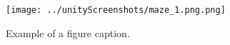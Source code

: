 \documentclass[conference]{IEEEtran}
\begin{document}
\begin{figure}[htbp]
\centerline{\texttt{[image: ../unityScreenshots/maze\_1.png.png]}}
\caption{Example of a figure caption.}
\label{fig}
\end{figure}







\end{document}
